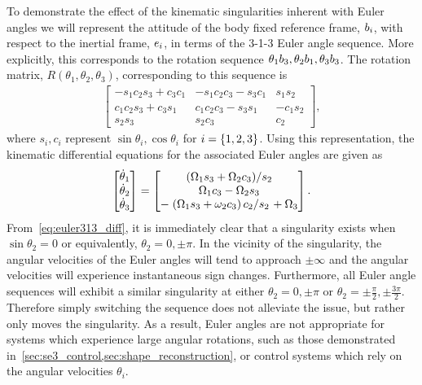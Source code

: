 To demonstrate the effect of the kinematic singularities inherent with Euler angles we will represent the attitude of the body fixed reference frame, \( b_i \), with respect to the inertial frame, \( e_i\), in terms of the 3-1-3 Euler angle sequence.
More explicitly, this corresponds to the rotation sequence \( \theta_1 b_3 , \theta_2 b_1, \theta_3 b_3 \).
The rotation matrix, \( R(\theta_1, \theta_2, \theta_3) \), corresponding to this sequence is 
\begin{align}\label{eq:euler313}
    \begin{bmatrix}
        -s_1 c_2 s_3 + c_3 c_1 & -s_1 c_2 c_3 - s_3 c_1 & s_1s_2 \\
        c_1 c_2 s_3 + c_3 s_1 & c_1 c_2 c_3 - s_3 s_1 & - c_1 s_2 \\
        s_2 s_3 & s_2 c_3 & c_2
    \end{bmatrix} ,
\end{align}
where \( s_i, c_i \) represent \( \sin \theta_i, \cos \theta_i \) for \( i = \left\{ 1,2,3 \right\}\).
Using this representation, the kinematic differential equations for the associated Euler angles are given as
\begin{align}\label{eq:euler313_diff}
    \begin{bmatrix}
        \dot{\theta}_1 \\ \dot{\theta}_2 \\ \dot{\theta}_3 
    \end{bmatrix}
    =
    \begin{bmatrix}
        \left.\left( \Omega_1 s_3 + \Omega_2 c_3 \right)\middle/s_2\right. \\
        \Omega_1 c_3 - \Omega_2 s_3 \\
        -\left.\left( \Omega_1 s_3 + \omega_2 c_3 \right)c_2\middle/s_2\right. + \Omega_3
    \end{bmatrix} .
\end{align}
From~\cref{eq:euler313_diff}, it is immediately clear that a singularity exists when \( \sin \theta_2 = 0 \) or equivalently, \( \theta_2 = 0, \pm \pi \). 
In the vicinity of the singularity, the angular velocities of the Euler angles will tend to approach \( \pm \infty \) and the angular velocities will experience instantaneous sign changes.
Furthermore, all Euler angle sequences will exhibit a similar singularity at either \( \theta_2 = 0, \pm \pi \) or \( \theta_2 = \pm \frac{\pi}{2}, \pm \frac{3\pi}{2} \).
Therefore simply switching the sequence does not alleviate the issue, but rather only moves the singularity.
As a result, Euler angles are not appropriate for systems which experience large angular rotations, such as those demonstrated in~\cref{sec:se3_control,sec:shape_reconstruction}, or control systems which rely on the angular velocities \( \theta_i \).

